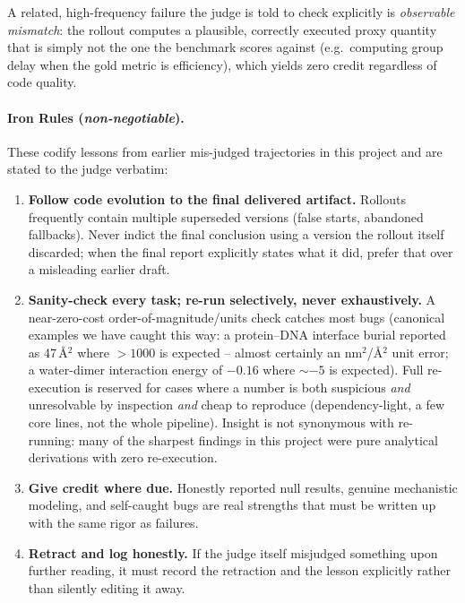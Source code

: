 A related, high-frequency failure the judge is told to check explicitly
is \emph{observable mismatch}: the rollout computes a plausible, correctly
executed proxy quantity that is simply not the one the benchmark scores
against (e.g.\ computing group delay when the gold metric is efficiency),
which yields zero credit regardless of code quality.

\paragraph{Iron Rules (\textit{non-negotiable}).} These
codify lessons from earlier mis-judged trajectories in this project and
are stated to the judge verbatim:

\begin{enumerate}
  \item \textbf{Follow code evolution to the final delivered artifact.}
  Rollouts frequently contain multiple superseded versions (false starts,
  abandoned fallbacks). Never indict the final conclusion using a version
  the rollout itself discarded; when the final report explicitly states
  what it did, prefer that over a misleading earlier draft.

  \item \textbf{Sanity-check every task; re-run selectively, never
  exhaustively.} A near-zero-cost order-of-magnitude/units check catches
  most bugs (canonical examples we have caught this way: a protein--DNA
  interface burial reported as 47\,\AA$^2$ where $>1000$ is expected --
  almost certainly an nm$^2$/\AA$^2$ unit error; a water-dimer interaction
  energy of $-0.16$ where $\sim-5$ is expected). Full re-execution is
  reserved for cases where a number is both suspicious \emph{and}
  unresolvable by inspection \emph{and} cheap to reproduce
  (dependency-light, a few core lines, not the whole pipeline). Insight is
  not synonymous with re-running: many of the sharpest findings in this
  project were pure analytical derivations with zero re-execution.

  \item \textbf{Give credit where due.} Honestly reported null results,
  genuine mechanistic modeling, and self-caught bugs are real strengths
  that must be written up with the same rigor as failures.

  \item \textbf{Retract and log honestly.} If the judge itself misjudged
  something upon further reading, it must record the retraction and the
  lesson explicitly rather than silently editing it away.


\end{enumerate}
